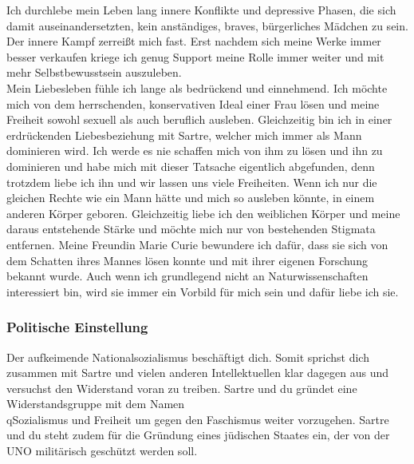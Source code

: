 \documentclass[12pt, a4paper, openany]{report}
\begin{document}
Ich durchlebe mein Leben lang innere Konflikte und depressive Phasen, die sich damit auseinandersetzten, kein anständiges, braves, bürgerliches Mädchen zu sein. Der innere Kampf zerreißt mich fast. Erst nachdem sich meine Werke immer besser verkaufen kriege ich genug Support meine Rolle immer weiter und mit mehr Selbstbewusstsein auszuleben. \\ 
Mein Liebesleben fühle ich lange als bedrückend und einnehmend. Ich möchte mich von dem  herrschenden, konservativen Ideal einer Frau lösen und meine Freiheit sowohl sexuell als auch beruflich ausleben. Gleichzeitig bin ich in einer erdrückenden Liebesbeziehung mit Sartre, welcher mich immer als Mann dominieren wird. Ich werde es nie schaffen mich von ihm zu lösen und ihn zu dominieren und habe mich mit dieser Tatsache eigentlich abgefunden, denn trotzdem liebe ich ihn und wir lassen uns viele Freiheiten.
Wenn ich nur die gleichen Rechte wie ein Mann hätte und mich so ausleben könnte, in einem anderen Körper geboren. Gleichzeitig liebe ich den weiblichen Körper und meine daraus entstehende Stärke und möchte mich nur von bestehenden Stigmata entfernen. Meine Freundin Marie Curie bewundere ich dafür, dass sie sich von dem Schatten ihres Mannes lösen konnte und mit ihrer eigenen Forschung bekannt wurde. Auch wenn ich grundlegend nicht an Naturwissenschaften interessiert bin, wird sie immer ein Vorbild für mich sein und dafür liebe ich sie. 



 
\subsubsection{Politische Einstellung} 

Der aufkeimende Nationalsozialismus beschäftigt dich. Somit sprichst dich zusammen mit Sartre und vielen anderen Intellektuellen klar dagegen aus und versuchst den Widerstand voran zu treiben. Sartre und du gründet eine Widerstandsgruppe mit dem Namen \\q{Sozialismus und Freiheit} um gegen den Faschismus weiter vorzugehen. Sartre und du steht zudem für die Gründung eines jüdischen Staates ein, der von der UNO militärisch geschützt werden soll. \\
\end{document}
